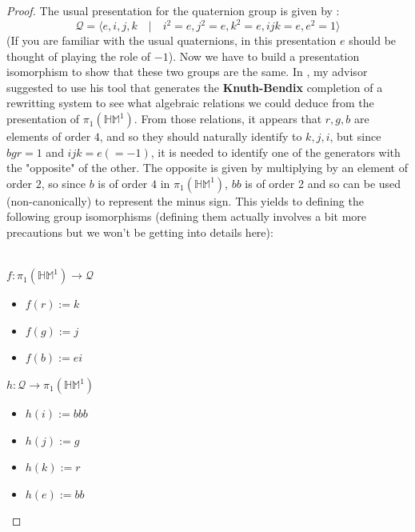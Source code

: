 \documentclass{report}
\begin{document}
\begin{proof} The usual presentation for the quaternion group is given by : 
  $$\mathcal{Q}  = \langle e,i,j,k \quad \vert \quad i^2 =e, j^2=e, k^2=e, ijk=e, e^2=1 \rangle$$
  (If you are familiar with the usual quaternions, in this presentation $e$ should be thought of  playing the role of $-1$).
  Now we have to build a presentation isomorphism to show that these two groups are the same. In \cite{QuaternionPresentation}, my advisor suggested to use his tool that generates the \textbf{Knuth-Bendix} completion of a rewritting system to see what algebraic relations we could deduce from the presentation of $\pi_1(\mathbb{HM}^1)$. From those relations, it appears that $r,g,b$ are elements of order $4$, and so they should naturally identify to $k,j,i$, but since $bgr=1$ and $ijk=e(=-1)$, it is needed to identify one of the generators with the "opposite" of the other. The opposite is given by multiplying by an element of order $2$, so since $b$ is of order $4$ in $\pi_1(\mathbb{HM}^1)$, $bb$ is of order 2 and so can be used (non-canonically) to represent the minus sign. This yields to defining the following group isomorphisms (defining them actually involves a bit more precautions but we won't be getting into details here):\\\\
  \begin{minipage}{.5\textwidth} 
    $f : \pi_1(\mathbb{HM}^1) \rightarrow \mathcal{Q}$
    \begin{itemize}
      \item $f(r) := k$
      \item $f(g) := j$
      \item $f(b) :=ei$
    \end{itemize}
  \end{minipage}
  \hfill 
  \begin{minipage}{.5\textwidth} 
    $h : \mathcal{Q} \rightarrow \pi_1(\mathbb{HM}^1)$
    \begin{itemize}
      \item $h(i) := bbb$
      \item $h(j) := g$
      \item $h(k) := r$
      \item $h(e) :=bb$
    \end{itemize}
  \end{minipage}
\end{proof}
\end{document}
